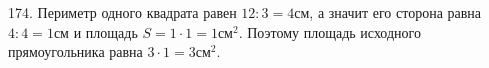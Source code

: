 174. Периметр одного квадрата равен $12:3=4$см, а значит его сторона равна $4:4=1$см и площадь $S=1\cdot1=1\text{см}^2.$ Поэтому площадь исходного прямоугольника равна $3\cdot1=3\text{см}^2.$\\
